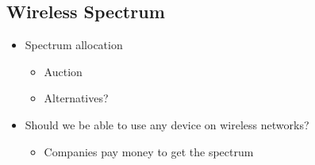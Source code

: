 \subsection{Wireless Spectrum}
\begin{itemize}[nosep]
    \item Spectrum allocation
          \begin{itemize}[nosep]
              \item Auction
              \item Alternatives?
          \end{itemize}
    \item Should we be able to use any device on wireless networks?
          \begin{itemize}[nosep]
              \item Companies pay money to get the spectrum
          \end{itemize}
\end{itemize}